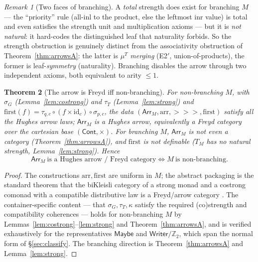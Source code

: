 \documentclass[11pt]{amsart}
\theoremstyle{plain}
\newtheorem{theorem}{Theorem}[section]
\theoremstyle{definition}
\theoremstyle{remark}
\newtheorem{remark}[theorem]{Remark}
\newcommand{\Cont}{\mathsf{Cont}}
\newcommand{\id}{\mathrm{id}}
\newcommand{\arr}{\mathrm{arr}}
\newcommand{\first}{\mathrm{first}}
\newcommand{\Maybe}{\mathsf{Maybe}}
\newcommand{\Writer}{\mathsf{Writer}}
\newcommand{\Arr}{\mathsf{Arr}}
\newcommand{\rcomp}{\mathbin{>\!\!>\!\!>}}
\begin{document}
\begin{remark}[Two faces of branching]
A \emph{total} strength does exist for branching $M$ --- the ``priority'' rule (all-$\mathrm{
inl}$ to the product, else the leftmost $\mathrm{inr}$ value) is total and even satisfies the
strength unit and multiplication axioms --- but it is \emph{not natural}: it hard-codes the
distinguished leaf that naturality forbids. So the strength obstruction is genuinely distinct
from the associativity obstruction of Theorem~\ref{thm:arrowsA}: the latter is $\mu^T$
\emph{merging} (E2$'$, union-of-products), the former is leaf-\emph{symmetry} (naturality).
Branching disables the arrow through two independent axioms, both equivalent to arity $\le1$.
\end{remark}

\begin{theorem}[The arrow is Freyd iff non-branching]\label{thm:arrowsB}
For non-branching $M$, with $\sigma_G$ (Lemma~\ref{lem:costrong}) and $\tau_T$
(Lemma~\ref{lem:strong}) and $\first(f)=\tau_{q,c}\circ(f\times\id_c)\circ\sigma_{p,c}$, the
data $(\Arr_M,\arr,\rcomp,\first)$ satisfy all the Hughes arrow laws;
$\Arr_M$ is a Hughes arrow, equivalently a Freyd category over the cartesian base
$(\Cont,\times)$. For branching $M$, $\Arr_M$ is not even a category
(Theorem~\ref{thm:arrowsA}), and $\first$ is not definable ($T_M$ has no natural strength,
Lemma~\ref{lem:strong}). Hence
\[
  \boxed{\ \Arr_M\ \text{is a Hughes arrow / Freyd category}\iff M\ \text{is non-branching}.\ }
\]
\end{theorem}
\begin{proof}
The constructions $\arr,\first$ are uniform in $M$; the abstract packaging is the standard
theorem that the biKleisli category of a strong monad and a costrong comonad with a compatible
distributive law is a Freyd/arrow category \cite{UustaluVene08,PowerRobinson97,Atkey11,
JacobsHeunenHasuo09}. The container-specific content --- that $\sigma_G,\tau_T,\kappa$ satisfy
the required (co)strength and compatibility coherences --- holds for non-branching $M$ by
Lemmas~\ref{lem:costrong}--\ref{lem:strong} and Theorem~\ref{thm:arrowsA}, and is verified
exhaustively for the representatives $\Maybe$ and $\Writer/\mathbb{Z}_2$, which span the
normal form of \S\ref{sec:classify}. The branching direction is Theorem~\ref{thm:arrowsA} and
Lemma~\ref{lem:strong}.
\end{proof}
\end{document}
